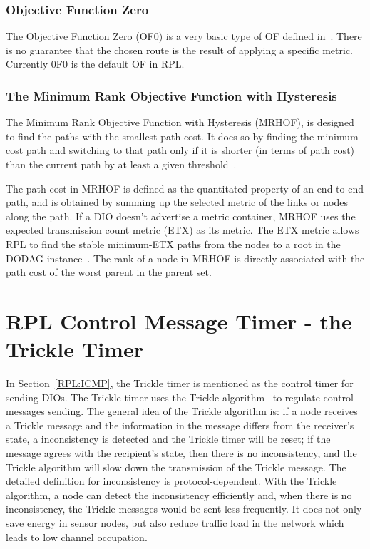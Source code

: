 \subsubsection{Objective Function Zero}
\label{RPL:OF0}
The Objective Function Zero (OF0) is a very basic type of OF defined in~\cite{draft-ietf-roll-of0-20}. There is no guarantee that the chosen route is the result of applying a specific metric. Currently 0F0 is the default OF in RPL.
 
\subsubsection{The Minimum Rank Objective Function with Hysteresis}
\label{RPL:MRHOF}
The Minimum Rank Objective Function with Hysteresis (MRHOF)\@, is designed to find the paths with the smallest path cost. It does so by finding the minimum cost path and switching to that path only if it is shorter (in terms of path cost) than the current path by at least a given threshold~\cite{MRHOF}. 

The path cost in MRHOF is defined as the quantitated property of an end-to-end path, and is obtained by summing up the selected metric of the links or nodes along the path. If a DIO doesn't advertise a metric container, MRHOF uses the expected transmission count metric (ETX) as its metric. The ETX metric allows RPL to find the stable minimum-ETX paths from the nodes to a root in the DODAG instance~\cite{MRHOF}. The rank of a node in MRHOF is directly associated with the path cost of the worst parent in the parent set.

\section{RPL Control Message Timer - the Trickle Timer}
\label{Trickle}
In Section~\ref{RPL:ICMP}, the Trickle timer is mentioned as the control timer for sending DIOs. The Trickle timer uses the Trickle algorithm~\cite{RFC 6206} to regulate control messages sending. The general idea of the Trickle algorithm is: if a node receives a Trickle message and the information in the message differs from the receiver's state, a inconsistency is detected and the Trickle timer will be reset; if the message agrees with the recipient's state, then there is no inconsistency, and the Trickle algorithm will slow down the transmission of the Trickle message. The detailed definition for inconsistency is protocol-dependent. With the Trickle algorithm, a node can detect the inconsistency efficiently and, when there is no inconsistency, the Trickle messages would be sent less frequently. It does not only save energy in sensor nodes, but also reduce traffic load in the network which leads to low channel occupation. 

